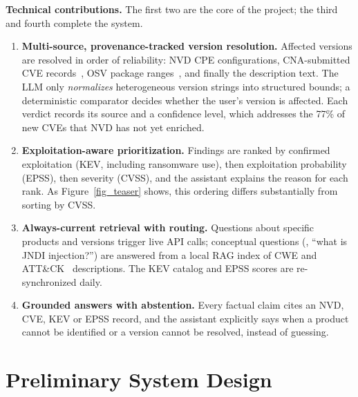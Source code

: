 \documentclass[final]{cvpr}
\begin{document}
\textbf{Technical contributions.} The first two are the core of the project; the third and fourth complete the system.
\begin{enumerate}
  \item \textbf{Multi-source, provenance-tracked version resolution.} Affected versions are resolved in order of reliability: NVD CPE configurations, CNA-submitted CVE records~\cite{cvelistv5}, OSV package ranges~\cite{osv}, and finally the description text. The LLM only \emph{normalizes} heterogeneous version strings into structured bounds; a deterministic comparator decides whether the user's version is affected. Each verdict records its source and a confidence level, which addresses the 77\% of new CVEs that NVD has not yet enriched.
  \item \textbf{Exploitation-aware prioritization.} Findings are ranked by confirmed exploitation (KEV, including ransomware use), then exploitation probability (EPSS), then severity (CVSS), and the assistant explains the reason for each rank. As Figure~\ref{fig_teaser} shows, this ordering differs substantially from sorting by CVSS.
  \item \textbf{Always-current retrieval with routing.} Questions about specific products and versions trigger live API calls; conceptual questions (\eg, ``what is JNDI injection?'') are answered from a local RAG index of CWE and ATT\&CK~\cite{attack} descriptions. The KEV catalog and EPSS scores are re-synchronized daily.
  \item \textbf{Grounded answers with abstention.} Every factual claim cites an NVD, CVE, KEV or EPSS record, and the assistant explicitly says when a product cannot be identified or a version cannot be resolved, instead of guessing.
\end{enumerate}

\section{Preliminary System Design}
\label{sec:design}
\end{document}
